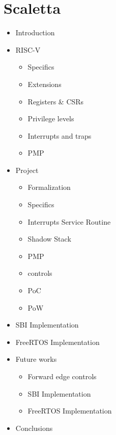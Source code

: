 \chapter*{Scaletta}
\label{cha:Scaletta}

\begin{itemize}
  \item Introduction

  \item RISC-V
    \begin{itemize}
      \item Specifics

      \item Extensions

      \item Registers \& CSRs

      \item Privilege levels

      \item Interrupts and traps

      \item PMP
    \end{itemize}

  \item Project
    \begin{itemize}
      \item Formalization

      \item Specifics

      \item Interrupts Service Routine

      \item Shadow Stack

      \item PMP

      \item controls

      \item PoC

      \item PoW
    \end{itemize}

  \item SBI Implementation

  \item FreeRTOS Implementation

  \item Future works
    \begin{itemize}
      \item Forward edge controls

      \item SBI Implementation

      \item FreeRTOS Implementation
    \end{itemize}

  \item Conclusions
\end{itemize}